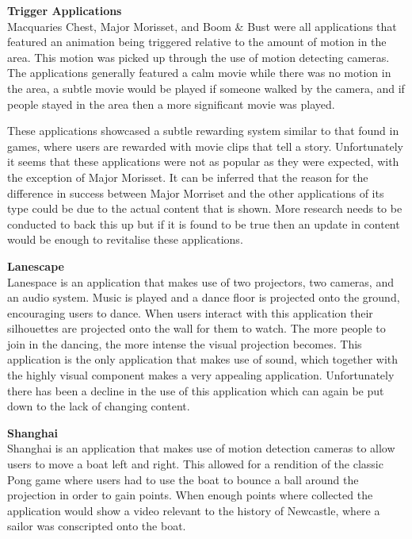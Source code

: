 \documentclass[a4paper,12pt]{article}
\begin{document}
\par
\textbf{Trigger Applications}\\
Macquaries Chest, Major Morisset, and Boom \& Bust were all applications that featured an animation being triggered relative to the amount of motion in the area. 
This motion was picked up through the use of motion detecting cameras. 
The applications generally featured a calm movie while there was no motion in the area, a subtle movie would be played if someone walked by the camera, and if people stayed in the area then a more significant movie was played.

These applications showcased a subtle rewarding system similar to that found in games, where users are rewarded with movie clips that tell a story. 
Unfortunately it seems that these applications were not as popular as they were expected, with the exception of Major Morisset. 
It can be inferred that the reason for the difference in success between Major Morriset and the other applications of its type could be due to the actual content that is shown.
More research needs to be conducted to back this up but if it is found to be true then an update in content would be enough to revitalise these applications.

\par
\textbf{Lanescape}\\
Lanespace is an application that makes use of two projectors, two cameras, and an audio system.
Music is played and a dance floor is projected onto the ground, encouraging users to dance.
When users interact with this application their silhouettes are projected onto the wall for them to watch.
The more people to join in the dancing, the more intense the visual projection becomes. 
This application is the only application that makes use of sound, which together with the highly visual component makes a very appealing application. 
Unfortunately there has been a decline in the use of this application which can again be put down to the lack of changing content. 

\par\textbf{Shanghai}\\
Shanghai is an application that makes use of motion detection cameras to allow users to move a boat left and right.
This allowed for a rendition of the classic Pong game where users had to use the boat to bounce a ball around the projection in order to gain points.
When enough points where collected the application would show a video relevant to the history of Newcastle, where a sailor was conscripted onto the boat.
\end{document}
